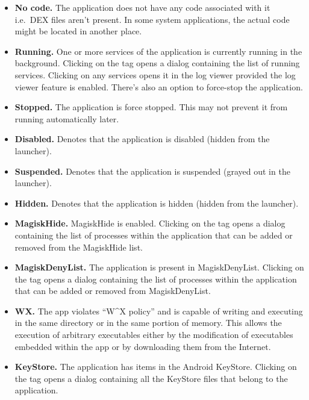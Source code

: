 \begin{itemize}
    \item \textbf{No code.} The application does not have any code associated with it i.e.\ DEX files aren't present.
    In some system applications, the actual code might be located in another place.

    \item \textbf{Running.} One or more services of the application is currently running in the background. Clicking
    on the tag opens a dialog containing the list of running services. Clicking on any services opens it in the log
    viewer provided the log viewer feature is enabled. There's also an option to force-stop the application.

    \item \textbf{Stopped.} The application is force stopped. This may not prevent it from running automatically later.

    \item \textbf{Disabled.} Denotes that the application is disabled (hidden from the launcher).

    \item \textbf{Suspended.} Denotes that the application is suspended (grayed out in the launcher).

    \item \textbf{Hidden.} Denotes that the application is hidden (hidden from the launcher).

    \item \textbf{MagiskHide.} MagiskHide is enabled. Clicking on the tag opens a dialog containing the list of
    processes within the application that can be added or removed from the MagiskHide list.

    \item \textbf{MagiskDenyList.} The application is present in MagiskDenyList. Clicking on the tag opens a dialog
    containing the list of processes within the application that can be added or removed from MagiskDenyList.

    \item \textbf{WX.} The app violates ``W\textasciicircum{}X policy'' and is capable of writing and executing in the same directory or
    in the same portion of memory. This allows the execution of arbitrary executables either by the modification of
    executables embedded within the app or by downloading them from the Internet.\\

    \item \textbf{KeyStore.} The application has items in the Android KeyStore. Clicking on the tag opens a dialog
    containing all the KeyStore files that belong to the application.


\end{itemize}
